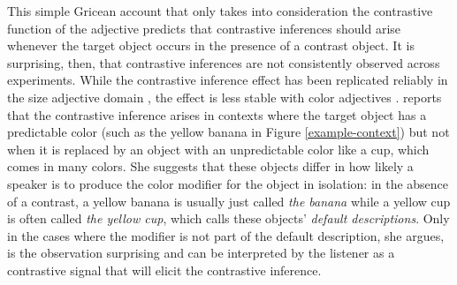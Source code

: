 \documentclass[10pt,letterpaper]{article}
\newcommand{\figref}[1]{Figure \ref{#1}}
\begin{document}
This simple Gricean account that only takes into consideration the contrastive function of the adjective predicts that contrastive inferences should arise whenever the target object occurs in the presence of a contrast object. It is surprising, then, that contrastive inferences are not consistently observed across experiments. While the contrastive inference effect has been replicated reliably in the size adjective domain \cite{Aparicio:2018,Grodner:2011,Ryskin:2019,Sedivy:1999}, the effect is less stable with color adjectives \cite{Sedivy:2003}.  reports that the contrastive inference arises in contexts where the target object has a predictable color (such as the yellow banana in \figref{example-context}) but not when it is replaced by an object with an unpredictable color like a cup, which comes in many colors.
She suggests that these objects differ in how likely a speaker is to produce the color modifier for the object in isolation: in the absence of a contrast, a yellow banana is usually just called \textit{the banana} while a yellow cup is often called \textit{the yellow cup}, which  calls these objects' \emph{default descriptions}. Only in the cases where the modifier is not part of the default description, she argues, is the observation surprising and can be interpreted by the listener as a contrastive signal that will elicit the contrastive inference.
\end{document}
